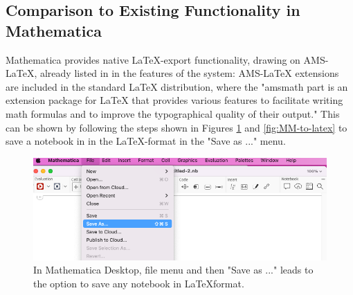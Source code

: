 \subsection{Comparison to Existing Functionality in Mathematica} \label{intro:existing-functionality}

Mathematica provides native \LaTeX-export functionality, drawing on AMS-LaTeX, already listed in in the features of the system: AMS-LaTeX extensions are included in the standard LaTeX distribution, where the "amsmath part is an extension package for LaTeX that provides various features to facilitate writing math formulas and to improve the typographical quality of their output." \cite{noauthor_american_nodate} This can be shown by following the steps shown in Figures \ref{fig:MM-save-as} and \ref{fig:MM-to-latex} to save a notebook in in the \LaTeX-format in the "Save as ..." menu.

\begin{figure}[h]
    \centering
    \includegraphics[scale=0.3]{images/introduction/MM-save-as.png}
    \caption{In Mathematica Desktop, file menu and then "Save as ..." leads to the option to save any notebook in \LaTeX format.}
    \label{fig:MM-save-as}
\end{figure}

